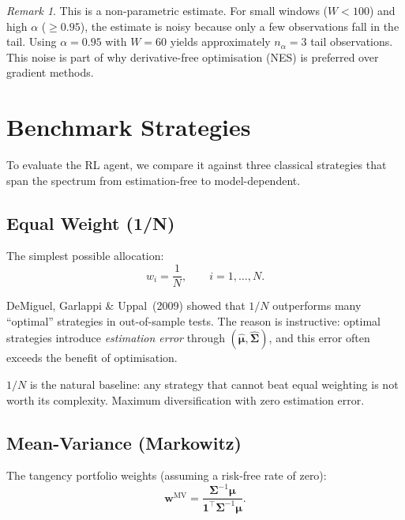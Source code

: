 \documentclass[11pt, a4paper]{article}
\theoremstyle{definition}
\theoremstyle{plain}
\theoremstyle{remark}
\newtheorem{remark}{Remark}[section]
\begin{document}
\begin{remark}
This is a non-parametric estimate. For small windows ($W < 100$) and
high $\alpha$ ($\geq 0.95$), the estimate is noisy because only a few
observations fall in the tail. Using $\alpha = 0.95$ with $W = 60$ yields
approximately $n_\alpha = 3$ tail observations. This noise is part of
why derivative-free optimisation (NES) is preferred over gradient methods.
\end{remark}


\section{Benchmark Strategies}
\label{sec:benchmarks}

To evaluate the RL agent, we compare it against three classical strategies
that span the spectrum from estimation-free to model-dependent.

\subsection{Equal Weight (1/N)}

The simplest possible allocation:
\begin{equation}
    w_i = \frac{1}{N}, \qquad i = 1, \ldots, N.
    \label{eq:equal_weight}
\end{equation}

DeMiguel, Garlappi \& Uppal~(2009) showed that $1/N$ outperforms many
``optimal'' strategies in out-of-sample tests. The reason is instructive:
optimal strategies introduce \emph{estimation error} through
$(\hat{\bm{\mu}}, \hat{\bm{\Sigma}})$, and this error often exceeds the
benefit of optimisation.

\begin{keyresult}
$1/N$ is the natural baseline: any strategy that cannot beat equal weighting
is not worth its complexity. Maximum diversification with zero estimation
error.
\end{keyresult}

\subsection{Mean-Variance (Markowitz)}

The tangency portfolio weights (assuming a risk-free rate of zero):
\begin{equation}
    \bm{w}^{\text{MV}}
    = \frac{\bm{\Sigma}^{-1}\bm{\mu}}
           {\bm{1}^\top\bm{\Sigma}^{-1}\bm{\mu}}.
    \label{eq:mv}
\end{equation}
\end{document}
